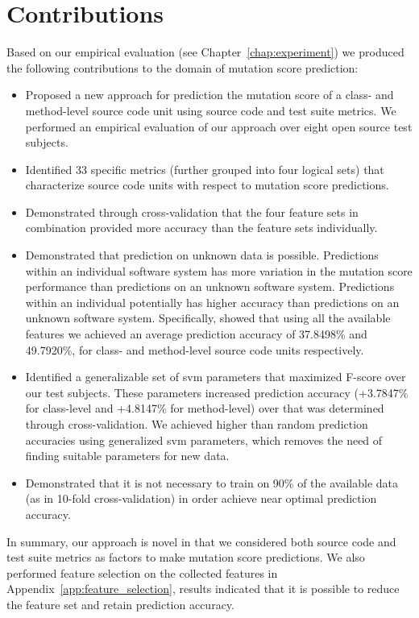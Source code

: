 \section{Contributions}
\label{sec:conclusions_contributions}
Based on our empirical evaluation (see Chapter~\ref{chap:experiment}) we produced the following contributions to the domain of mutation score prediction:

\begin{itemize}
  \item Proposed a new approach for prediction the mutation score of a class- and method-level source code unit using source code and test suite metrics. We performed an empirical evaluation of our approach over eight open source test subjects.
  \item Identified 33 specific metrics (further grouped into four logical sets) that characterize source code units with respect to mutation score predictions.
  \item Demonstrated through cross-validation that the four feature sets in combination provided more accuracy than the feature sets individually.
  \item Demonstrated that prediction on unknown data is possible. Predictions within an individual software system has more variation in the mutation score performance than predictions on an unknown software system. Predictions within an individual potentially has higher accuracy than predictions on an unknown software system. Specifically, showed that using all the available features we achieved an average prediction accuracy of 37.8498\% and 49.7920\%, for class- and method-level source code units respectively.
  \item Identified a generalizable set of \gls{svm} parameters that maximized F-score over our test subjects. These parameters increased prediction accuracy (+3.7847\% for class-level and +4.8147\% for method-level) over that was determined through cross-validation. We achieved higher than random prediction accuracies using generalized \gls{svm} parameters, which removes the need of finding suitable parameters for new data.
  \item Demonstrated that it is not necessary to train on 90\% of the available data (as in 10-fold cross-validation) in order achieve near optimal prediction accuracy.
\end{itemize}

In summary, our approach is novel in that we considered both source code and test suite metrics as factors to make mutation score predictions. We also performed feature selection on the collected features in Appendix~\ref{app:feature_selection}, results indicated that it is possible to reduce the feature set and retain prediction accuracy.



